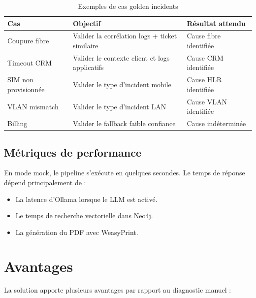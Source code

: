 \begin{table}[H]
    \centering
    \renewcommand{\arraystretch}{1.2}
    \begin{tabular}{|l|p{7cm}|l|}
        \hline
        \rowcolor{iNavy} \textbf{\color{white}Cas} & \textbf{\color{white}Objectif} & \textbf{\color{white}Résultat attendu} \\ \hline
        Coupure fibre & Valider la corrélation logs + ticket similaire & Cause fibre identifiée \\ \hline
        Timeout CRM & Valider le contexte client et logs applicatifs & Cause CRM identifiée \\ \hline
        SIM non provisionnée & Valider le type d'incident mobile & Cause HLR identifiée \\ \hline
        VLAN mismatch & Valider le type d'incident LAN & Cause VLAN identifiée \\ \hline
        Billing & Valider le fallback faible confiance & Cause indéterminée \\ \hline
    \end{tabular}
    \caption{Exemples de cas golden incidents}
    \label{tab:golden}
\end{table}

\subsection{Métriques de performance}
En mode mock, le pipeline s'exécute en quelques secondes. Le temps de réponse dépend principalement de :

\begin{itemize}
    \setlength\itemsep{0.1em}
    \setlength\parskip{0pt}
    \setlength\parsep{0pt}
    \item La latence d'Ollama lorsque le LLM est activé.
    \item Le temps de recherche vectorielle dans Neo4j.
    \item La génération du PDF avec WeasyPrint.
\end{itemize}

\section{Avantages}
La solution apporte plusieurs avantages par rapport au diagnostic manuel :

